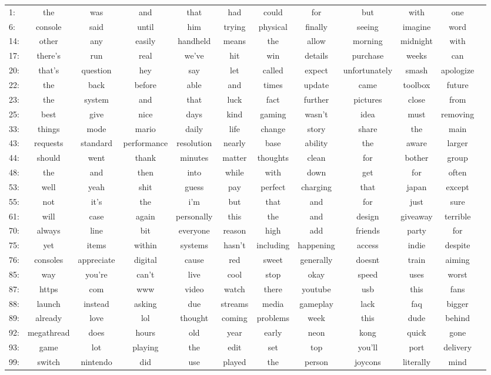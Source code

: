 \documentclass[11pt]{article} %
\begin{document}
\begin{landscape}
\begin{tabular}{|l|c c c c c c c c c c c}
1: &  the&was&and&that&had&could&for&but&with&one\\
6: &  console&said&until&him&trying&physical&finally&seeing&imagine&word\\
14: &  other&any&easily&handheld&means&the&allow&morning&midnight&with\\
17: &  there's&run&real&we've&hit&win&details&purchase&weeks&can\\
20: &  that's&question&hey&say&let&called&expect&unfortunately&smash&apologize\\
22: &  the&back&before&able&and&times&update&came&toolbox&future\\
23: &  the&system&and&that&luck&fact&further&pictures&close&from\\
25: &  best&give&nice&days&kind&gaming&wasn't&idea&must&removing\\
33: &  things&mode&mario&daily&life&change&story&share&the&main\\
43: &  requests&standard&performance&resolution&nearly&base&ability&the&aware&larger\\
44: &  should&went&thank&minutes&matter&thoughts&clean&for&bother&group\\
48: &  the&and&then&into&while&with&down&get&for&often\\
53: &  well&yeah&shit&guess&pay&perfect&charging&that&japan&except\\
55: &  not&it's&the&i'm&but&that&and&for&just&sure\\
61: &  will&case&again&personally&this&the&and&design&giveaway&terrible\\
70: &  always&line&bit&everyone&reason&high&add&friends&party&for\\
75: &  yet&items&within&systems&hasn't&including&happening&access&indie&despite\\
76: &  consoles&appreciate&digital&cause&red&sweet&generally&doesnt&train&aiming\\
85: &  way&you're&can't&live&cool&stop&okay&speed&uses&worst\\
87: &  https&com&www&video&watch&there&youtube&usb&this&fans\\
88: &  launch&instead&asking&due&streams&media&gameplay&lack&faq&bigger\\
89: &  already&love&lol&thought&coming&problems&week&this&dude&behind\\
92: &  megathread&does&hours&old&year&early&neon&kong&quick&gone\\
93: &  game&lot&playing&the&edit&set&top&you'll&port&delivery\\
99: &  switch&nintendo&did&use&played&the&person&joycons&literally&mind\\
\end{tabular}
\end{landscape}
\restoregeometry
\end{document}
